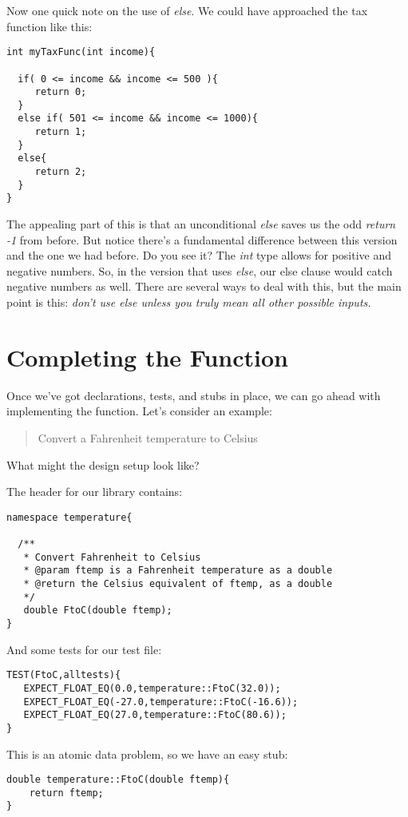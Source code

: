 \documentclass[]{tufte-handout}
\begin{document}
Now one quick note on the use of \textit{else}.  We could have approached the tax function like this:
\begin{verbatim}
int myTaxFunc(int income){
  
  if( 0 <= income && income <= 500 ){
     return 0;
  }
  else if( 501 <= income && income <= 1000){
     return 1;
  }
  else{
     return 2;
  }
}
\end{verbatim}
The appealing part of this is that an unconditional \textit{else} saves us the odd \textit{return -1} from before. But notice there's a fundamental difference between this version and the one we had before. Do you see it? The \textit{int} type allows for positive and negative numbers.  So, in the version that uses \textit{else}, our else clause would catch negative numbers as well.  There are several ways to deal with this, but the main point is this: \textit{don't use else unless you truly mean all other possible inputs.}  

\section{Completing the Function}

Once we've got declarations, tests, and stubs in place, we can go ahead with implementing the function.  Let's consider an example:
\begin{quote}
Convert a Fahrenheit temperature to Celsius 
\end{quote}
What might the design setup look like?

The header for our library contains:
\begin{verbatim}
namespace temperature{

  /**
   * Convert Fahrenheit to Celsius
   * @param ftemp is a Fahrenheit temperature as a double
   * @return the Celsius equivalent of ftemp, as a double
   */
   double FtoC(double ftemp);
}
\end{verbatim}

And some tests for our test file:
\begin{verbatim}
TEST(FtoC,alltests){
   EXPECT_FLOAT_EQ(0.0,temperature::FtoC(32.0));
   EXPECT_FLOAT_EQ(-27.0,temperature::FtoC(-16.6));
   EXPECT_FLOAT_EQ(27.0,temperature::FtoC(80.6));
}   
\end{verbatim}

This is an atomic data problem, so we have an easy stub:
\begin{verbatim}
double temperature::FtoC(double ftemp){
	return ftemp;
}
\end{verbatim}
\end{document}
